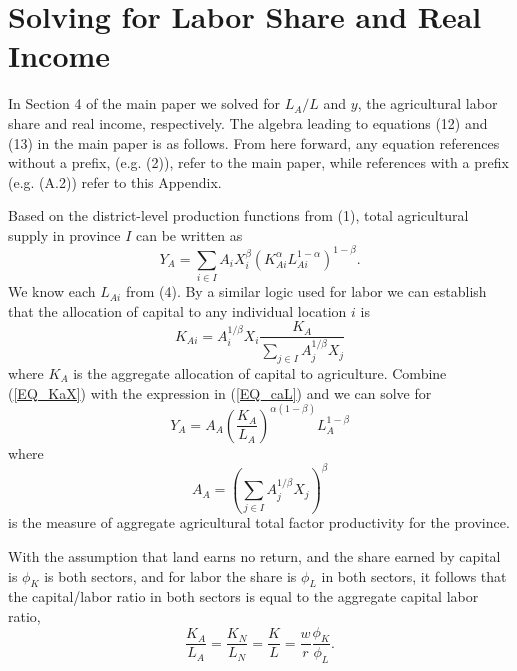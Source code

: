 \documentclass[11pt]{article}
\begin{document}
\section{Solving for Labor Share and Real Income}\label{APP_solve}
In Section 4 of the main paper we solved for $L_A/L$ and $y$, the agricultural labor share and real income, respectively. The algebra leading to equations (12) and (13) in the main paper is as follows. From here forward, any equation references without a prefix, (e.g. (2)), refer to the main paper, while references with a prefix (e.g. (A.2)) refer to this Appendix.

Based on the district-level production functions from (1), total agricultural supply in province $I$ can be written as
\begin{equation}
Y_A = \sum_{i \in I} A_{i} X_{i}^{\beta} \left(K_{Ai}^{\alpha}L_{Ai}^{1-\alpha}\right)^{1-\beta}. \label{EQ_caL}
\end{equation}
We know each $L_{Ai}$ from (4). By a similar logic used for labor we can establish that the allocation of capital to any individual location $i$ is
\begin{equation}
    K_{Ai} = A_{i}^{1/\beta} X_i \frac{K_A}{\sum_{j\in I} A_{j}^{1/\beta}X_{j}} \label{EQ_KaX}
\end{equation}
where $K_A$ is the aggregate allocation of capital to agriculture. Combine (\ref{EQ_KaX}) with the expression in (\ref{EQ_caL}) and we can solve for 
\begin{equation}
    Y_A = A_A \left(\frac{K_A}{L_A}\right)^{\alpha(1-\beta)} L_A^{1-\beta} \nonumber
\end{equation}
where 
\begin{equation}
    A_A = \left(\sum_{j\in I} A_{j}^{1/\beta}X_{j} \right)^\beta \nonumber
\end{equation}
is the measure of aggregate agricultural total factor productivity for the province. 

With the assumption that land earns no return, and the share earned by capital is $\phi_K$ is both sectors, and for labor the share is $\phi_L$ in both sectors, it follows that the capital/labor ratio in both sectors is equal to the aggregate capital labor ratio,
\begin{equation}
    \frac{K_A}{L_A} = \frac{K_N}{L_N} = \frac{K}{L} = \frac{w}{r}\frac{\phi_K}{\phi_L}. \nonumber
\end{equation}
\end{document}
